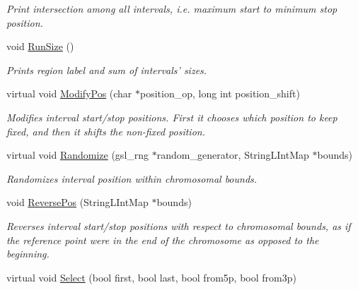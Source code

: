 \begin{CompactItemize}
\begin{CompactList}\small\item\em Print intersection among all intervals, i.e. maximum start to minimum stop position. \item\end{CompactList}\item 
\hypertarget{classGenomicRegion_08db190bc63e6f1d6fc90679dc5e6868}{
void \hyperlink{classGenomicRegion_08db190bc63e6f1d6fc90679dc5e6868}{RunSize} ()}
\label{classGenomicRegion_08db190bc63e6f1d6fc90679dc5e6868}

\begin{CompactList}\small\item\em Prints region label and sum of intervals' sizes. \item\end{CompactList}\item 
virtual void \hyperlink{classGenomicRegion_0721b07af0850057e4ab9cd416ecac2f}{ModifyPos} (char $\ast$position\_\-op, long int position\_\-shift)
\begin{CompactList}\small\item\em Modifies interval start/stop positions. First it chooses which position to keep fixed, and then it shifts the non-fixed position. \item\end{CompactList}\item 
\hypertarget{classGenomicRegion_222b3b8f567c306ee5a71ea3a720ef43}{
virtual void \hyperlink{classGenomicRegion_222b3b8f567c306ee5a71ea3a720ef43}{Randomize} (gsl\_\-rng $\ast$random\_\-generator, StringLIntMap $\ast$bounds)}
\label{classGenomicRegion_222b3b8f567c306ee5a71ea3a720ef43}

\begin{CompactList}\small\item\em Randomizes interval position within chromosomal bounds. \item\end{CompactList}\item 
\hypertarget{classGenomicRegion_6120af435fb9ee68cb5a3d5066a4fda4}{
void \hyperlink{classGenomicRegion_6120af435fb9ee68cb5a3d5066a4fda4}{ReversePos} (StringLIntMap $\ast$bounds)}
\label{classGenomicRegion_6120af435fb9ee68cb5a3d5066a4fda4}

\begin{CompactList}\small\item\em Reverses interval start/stop positions with respect to chromosomal bounds, as if the reference point were in the end of the chromosome as opposed to the beginning. \item\end{CompactList}\item 
\hypertarget{classGenomicRegion_461fbb00db1b45061e641f37614fb146}{
virtual void \hyperlink{classGenomicRegion_461fbb00db1b45061e641f37614fb146}{Select} (bool first, bool last, bool from5p, bool from3p)}
\label{classGenomicRegion_461fbb00db1b45061e641f37614fb146}


\end{CompactItemize}
